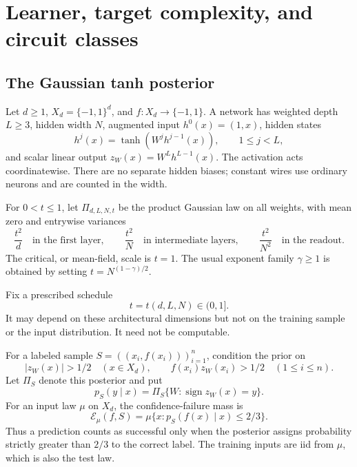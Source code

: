 \documentclass[11pt]{article}
\theoremstyle{remark}\newtheorem{remark}[theorem]{Remark}
\newcommand{\sgn}{\operatorname{sign}}
\begin{document}
\section{Learner, target complexity, and circuit classes}
\label{sec:model}

\subsection{The Gaussian tanh posterior}

Let $d\ge1$, $X_d=\{-1,1\}^d$, and $f:X_d\to\{-1,1\}$.
A network has weighted depth $L\ge3$, hidden width $N$, augmented input
$h^0(x)=(1,x)$, hidden states
\[
 h^j(x)=\tanh(W^j h^{j-1}(x)),\qquad 1\le j<L,
\]
and scalar linear output $z_W(x)=W^L h^{L-1}(x)$.
The activation acts coordinatewise. There are no separate hidden biases;
constant wires use ordinary neurons and are counted in the width.

For $0<t\le1$, let $\Pi_{d,L,N,t}$ be the product Gaussian law on all
weights, with mean zero and entrywise variances
\begin{equation}\label{eq:prior}
 \frac{t^2}{d}\quad\text{in the first layer},\qquad
 \frac{t^2}{N}\quad\text{in intermediate layers},\qquad
 \frac{t^2}{N^2}\quad\text{in the readout}.
\end{equation}
The critical, or mean-field, scale is $t=1$.
The usual exponent family $\gamma\ge1$ is obtained by setting
$t=N^{(1-\gamma)/2}$.

Fix a prescribed schedule
\begin{equation}\label{eq:schedule}
 t=t(d,L,N)\in(0,1].
\end{equation}
It may depend on these architectural dimensions but not on the training
sample or the input distribution. It need not be computable.

For a labeled sample $S=((x_i,f(x_i)))_{i=1}^n$, condition the prior on
\begin{equation}\label{eq:conditioning}
 |z_W(x)|>1/2\quad(x\in X_d),\qquad
 f(x_i)z_W(x_i)>1/2\quad(1\le i\le n).
\end{equation}
Let $\Pi_S$ denote this posterior and put
\[
 p_S(y\mid x)=\Pi_S\{W:\sgn z_W(x)=y\}.
\]
For an input law $\mu$ on $X_d$, the confidence-failure mass is
\begin{equation}\label{eq:error}
 \mathcal E_\mu(f,S)
   =\mu\{x:p_S(f(x)\mid x)\le2/3\}.
\end{equation}
Thus a prediction counts as successful only when the posterior assigns
probability strictly greater than $2/3$ to the correct label.
The training inputs are iid from $\mu$, which is also the test law.
\end{document}
